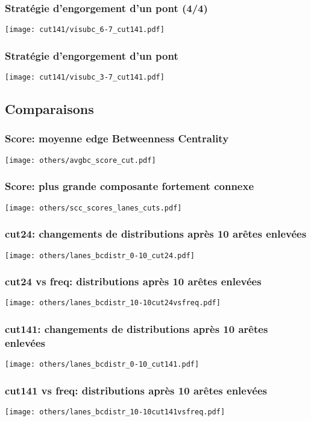 \documentclass[aspectratio=169]{beamer}
\begin{document}
    \begin{frame}
        \frametitle{Stratégie d'engorgement d'un pont (4/4)}
        \texttt{[image: cut141/visubc\_6-7\_cut141.pdf]}
    \end{frame}

    \begin{frame}
        \frametitle{Stratégie d'engorgement d'un pont}
        \texttt{[image: cut141/visubc\_3-7\_cut141.pdf]}
    \end{frame}

    \subsection{Comparaisons}

    \begin{frame}
        \frametitle{Score: moyenne edge Betweenness Centrality}
        \centering
        \texttt{[image: others/avgbc\_score\_cut.pdf]}
    \end{frame}

    \begin{frame}
        \frametitle{Score: plus grande composante fortement connexe}
        \centering
        \texttt{[image: others/scc\_scores\_lanes\_cuts.pdf]}
    \end{frame}

    \begin{frame}
        \frametitle{cut24: changements de distributions après 10 arêtes enlevées}
        \centering
        \texttt{[image: others/lanes\_bcdistr\_0-10\_cut24.pdf]}    
    \end{frame}


    \begin{frame}
        \frametitle{cut24 vs freq: distributions après 10 arêtes enlevées}
        \centering
        \texttt{[image: others/lanes\_bcdistr\_10-10cut24vsfreq.pdf]}    
    \end{frame}

    \begin{frame}
        \frametitle{cut141: changements de distributions après 10 arêtes enlevées}
        \centering
        \texttt{[image: others/lanes\_bcdistr\_0-10\_cut141.pdf]}    
    \end{frame}

    \begin{frame}
        \frametitle{cut141 vs freq: distributions après 10 arêtes enlevées}
        \centering
        \texttt{[image: others/lanes\_bcdistr\_10-10cut141vsfreq.pdf]}    
    \end{frame}
\end{document}
